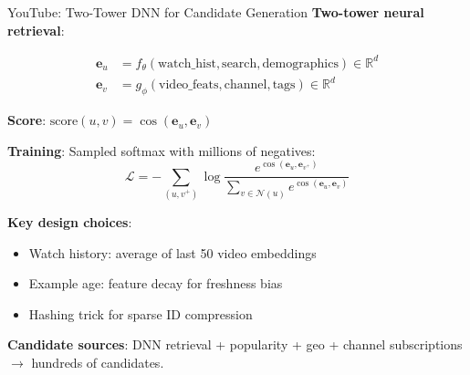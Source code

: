 \documentclass[aspectratio=169, 11pt]{beamer}
\begin{document}
\begin{frame}{YouTube: Two-Tower DNN for Candidate Generation}
\small
\textbf{Two-tower neural retrieval}:

\begin{align*}
\mathbf{e}_u &= f_\theta(\text{watch\_hist}, \text{search}, \text{demographics}) \in \mathbb{R}^d \\
\mathbf{e}_v &= g_\phi(\text{video\_feats}, \text{channel}, \text{tags}) \in \mathbb{R}^d
\end{align*}

\textbf{Score}: $\displaystyle \text{score}(u,v) = \cos(\mathbf{e}_u, \mathbf{e}_v)$

\vspace{0.1cm}
\textbf{Training}: Sampled softmax with millions of negatives:
\begin{equation*}
\mathcal{L} = -\sum_{(u,v^+)} \log \frac{e^{\cos(\mathbf{e}_u,\mathbf{e}_{v^+})}}{\sum_{v \in \mathcal{N}(u)} e^{\cos(\mathbf{e}_u,\mathbf{e}_v)}}
\end{equation*}

\vspace{0.1cm}
\textbf{Key design choices}:
\begin{itemize}
    \item Watch history: average of last 50 video embeddings
    \item Example age: feature decay for freshness bias
    \item Hashing trick for sparse ID compression
\end{itemize}

\vspace{0.1cm}
\textbf{Candidate sources}: DNN retrieval + popularity + geo + channel subscriptions $\to$ hundreds of candidates.
\end{frame}
\end{document}
